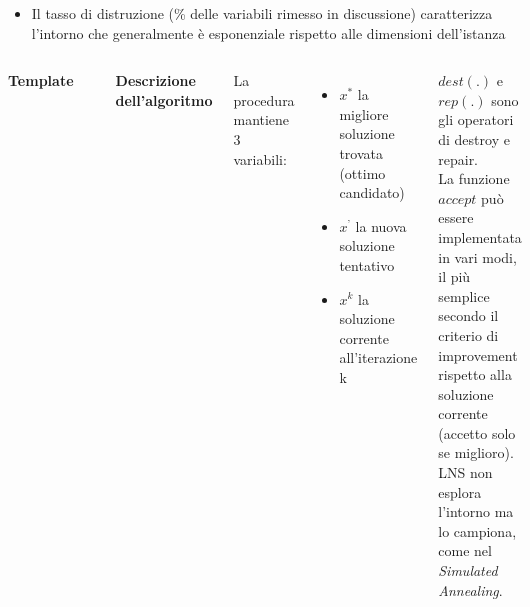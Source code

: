 \documentclass[9pt]{beamer}
\begin{document}
\begin{frame}{\subsecname}
\begin{itemize}
		\item
		Il tasso di distruzione (\% delle variabili rimesso in discussione) caratterizza l’intorno che generalmente è esponenziale rispetto alle dimensioni dell’istanza
	\end{itemize}

\framebreak

	\begin{columns}[T,onlytextwidth]
\textbf{Template}
\begin{verbatim}
Procedure ;$Large\,Neighborhood\,Search$;
;$x^{0}$; = GenerateInitialSolution
k = 0
;$x^{*}$; = ;$x^{k}$;
repeat
	;$x^{’}$; = rep (dest(;$x^{k}$;))
	if accept(;$x^{’}$;, ;$x^{k}$;) then ;$x^{k}$; = ;$x^{’}$;, k = k + 1
	if c(;$x^{k}$;) < c(;$x^{*}$;) then ;$x^{*}$; = ;$x^{k}$;
until StopCondition
return (;$x^{*}$;)
end
\end{verbatim}
		\textbf{Descrizione dell’algoritmo} \\
		{\scriptsize
		La procedura mantiene 3 variabili:
		\begin{itemize}
			\item
			$x^{*}$ la migliore soluzione trovata (ottimo candidato)
			\item
			$x^{’}$ la nuova soluzione tentativo
			\item
			$x^{k}$ la soluzione corrente all’iterazione k
		\end{itemize}
		$dest(.)$ e $rep(.)$ sono gli operatori di destroy e repair. \\
		La funzione $accept$ può essere implementata in vari modi, il più semplice secondo il criterio di improvement rispetto alla soluzione corrente (accetto solo se miglioro). \\
		LNS non esplora l’intorno ma lo campiona, come nel \emph{Simulated Annealing}.

		}
	
	  \end{columns}

\framebreak


\end{frame}
\end{document}
